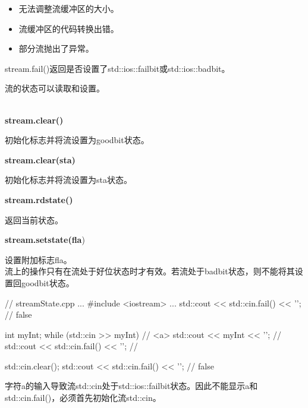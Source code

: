 \begin{itemize}
\item 
无法调整流缓冲区的大小。

\item 
流缓冲区的代码转换出错。

\item 
部分流抛出了异常。
\end{itemize}

stream.fail()返回是否设置了std::ios::failbit或std::ios::badbit。

流的状态可以读取和设置。

\noindent
\\\textbf{stream.clear()}

初始化标志并将流设置为goodbit状态。

\noindent
\textbf{stream.clear(sta)}

初始化标志并将流设置为sta状态。

\noindent
\textbf{stream.rdstate()}

返回当前状态。

\noindent
\textbf{stream.setstate(fla})

设置附加标志fla。\\

流上的操作只有在流处于好位状态时才有效。若流处于badbit状态，则不能将其设置回goodbit状态。


\begin{cpp}
// streamState.cpp
...
#include <iostream>
...
std::cout << std::cin.fail() << '\n'; // false

int myInt;
while (std::cin >> myInt){ // <a>
	std::cout << myInt << '\n'; //
	std::cout << std::cin.fail() << '\n'; //
}

std::cin.clear();
std::cout << std::cin.fail() << '\n'; // false
\end{cpp}

字符a的输入导致流std::cin处于std::ios::failbit状态。因此不能显示a和std::cin.fail()，必须首先初始化流std::cin。































